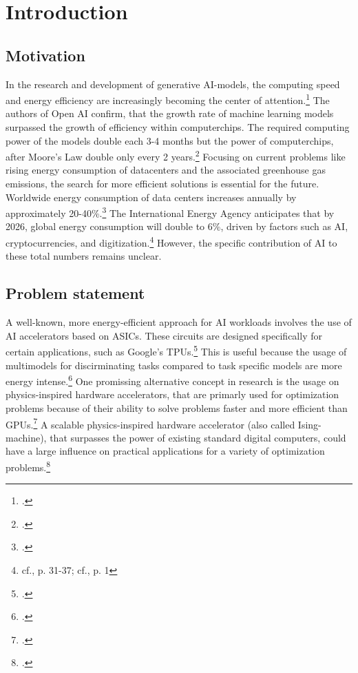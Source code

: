 \chapter{Introduction}


\section{Motivation}

In the research and development of generative AI-models, the computing speed and energy efficiency
are increasingly becoming the center of attention.\footcite[cf.][1]{luccioniPowerHungryProcessing2023}
The authors of Open AI confirm, that the growth rate of machine learning models 
surpassed the growth of efficiency within computerchips.
The required computing power of the models double each 3-4 months but the power of computerchips, after Moore’s Law 
double only every 2 years.\footcite[cf.][1]{darioamodeiAICompute}
Focusing on current problems like rising energy consumption of datacenters and the associated
greenhouse gas emissions, the search for more efficient solutions is essential for the future.
Worldwide energy consumption of data centers increases annually by approximately 20-40\%.\footcite[cf.][1]{hintemannDataCenters20212022} 
The International Energy Agency anticipates that by 2026, global energy consumption will double to 6\%, driven by factors such as AI, cryptocurrencies, and digitization.\footnote{cf.\cite{anon.Electricity2024Analysis2024}, p. 31-37; cf.\cite{jacksonAIBoomWill2024}, p. 1}
However, the specific contribution of AI to these total numbers remains unclear.

\section{Problem statement}

A well-known, more energy-efficient approach for AI workloads involves the use of AI accelerators based on \ac{ASIC}s.
These circuits are designed specifically for certain applications, such as Google's \ac{TPU}s.\footcite[cf.][39]{wittpahlKuenstlicheIntelligenzTechnologie2019} 
This is useful because the usage of multimodels for discirminating tasks compared to
task specific models are more energy intense.\footcite[cf.][5]{luccioniPowerHungryProcessing2023}
One promissing alternative concept in research is the usage on physics-inspired hardware accelerators, that are primarly used for optimization problems
because of their ability to solve problems faster and more efficient than GPUs.\footcite[cf.][1]{mohseniIsingMachinesHardware2022}
A scalable physics-inspired hardware accelerator (also called Ising-machine),
that surpasses the power of existing standard digital computers, could have a large influence
on practical applications for a variety of optimization problems.\footcite[cf.][1]{mohseniIsingMachinesHardware2022}

